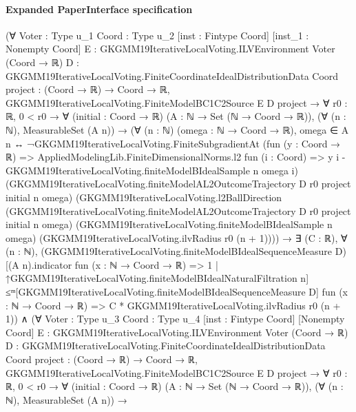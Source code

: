 \documentclass[10pt]{article}
\begin{document}
\paragraph{Expanded PaperInterface specification}
\begin{ReviewVerbatim}
(∀ {Voter : Type u_1} {Coord : Type u_2} [inst : Fintype Coord] [inst_1 : Nonempty Coord]
    {E : GKGMM19IterativeLocalVoting.ILVEnvironment Voter (Coord → ℝ)}
    {D : GKGMM19IterativeLocalVoting.FiniteCoordinateIdealDistributionData Coord} {project : (Coord → ℝ) → Coord → ℝ},
    GKGMM19IterativeLocalVoting.FiniteModelBC1C2Source E D project →
      ∀ {r0 : ℝ},
        0 < r0 →
          ∀ (initial : Coord → ℝ) (A : ℕ → Set (ℕ → Coord → ℝ)),
            (∀ (n : ℕ), MeasurableSet (A n)) →
              (∀ (n : ℕ) (omega : ℕ → Coord → ℝ),
                  omega ∈ A n ↔
                    ¬GKGMM19IterativeLocalVoting.FiniteSubgradientAt
                        (fun (y : Coord → ℝ) =>
                          AppliedModelingLib.FiniteDimensionalNorms.l2 fun (i : Coord) =>
                            y i - GKGMM19IterativeLocalVoting.finiteModelBIdealSample n omega i)
                        (GKGMM19IterativeLocalVoting.finiteModelAL2OutcomeTrajectory D r0 project initial n omega)
                        (GKGMM19IterativeLocalVoting.l2BallDirection
                          (GKGMM19IterativeLocalVoting.finiteModelAL2OutcomeTrajectory D r0 project initial n omega)
                          (GKGMM19IterativeLocalVoting.finiteModelBIdealSample n omega)
                          (GKGMM19IterativeLocalVoting.ilvRadius r0 (n + 1)))) →
                ∃ (C : ℝ),
                  ∀ (n : ℕ),
                    (GKGMM19IterativeLocalVoting.finiteModelBIdealSequenceMeasure
                          D)[(A n).indicator fun (x : ℕ → Coord → ℝ) => 1 |
                        ↑GKGMM19IterativeLocalVoting.finiteModelBIdealNaturalFiltration
                          n] ≤ᵐ[GKGMM19IterativeLocalVoting.finiteModelBIdealSequenceMeasure D]
                      fun (x : ℕ → Coord → ℝ) => C * GKGMM19IterativeLocalVoting.ilvRadius r0 (n + 1)) ∧
  (∀ {Voter : Type u_3} {Coord : Type u_4} [inst : Fintype Coord] [Nonempty Coord]
      {E : GKGMM19IterativeLocalVoting.ILVEnvironment Voter (Coord → ℝ)}
      {D : GKGMM19IterativeLocalVoting.FiniteCoordinateIdealDistributionData Coord} {project : (Coord → ℝ) → Coord → ℝ},
      GKGMM19IterativeLocalVoting.FiniteModelBC1C2Source E D project →
        ∀ {r0 : ℝ},
          0 < r0 →
            ∀ (initial : Coord → ℝ) (A : ℕ → Set (ℕ → Coord → ℝ)),
              (∀ (n : ℕ), MeasurableSet (A n)) →

\end{ReviewVerbatim}
\end{document}
